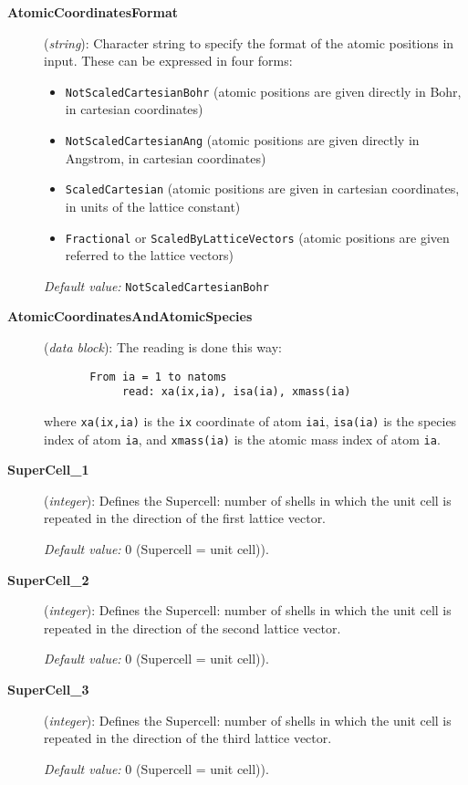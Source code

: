 \begin{description}
\item[{\bf AtomicCoordinatesFormat}] ({\it string}): 
Character string to specify the format of the atomic positions in
input. These can be expressed in four forms:
\begin{itemize}
\item {\tt NotScaledCartesianBohr} (atomic positions are given directly in
Bohr, in cartesian coordinates)
\item {\tt NotScaledCartesianAng} (atomic positions are given directly in
Angstrom, in cartesian coordinates)
\item {\tt ScaledCartesian} (atomic positions are given 
in cartesian coordinates, in units of the lattice constant)
\item {\tt Fractional} or {\tt ScaledByLatticeVectors} (atomic positions 
are given referred to the lattice vectors)
\end{itemize}

{\it Default value:} {\tt NotScaledCartesianBohr}



\item[{\bf AtomicCoordinatesAndAtomicSpecies}] ({\it data block}): 
The reading is done this way:
\begin{verbatim}
       From ia = 1 to natoms
            read: xa(ix,ia), isa(ia), xmass(ia)
\end{verbatim}
where {\tt xa(ix,ia)} is the {\tt ix} coordinate of atom 
{\tt iai}, {\tt isa(ia)} is the species index of atom {\tt ia}, and
{\tt xmass(ia)} is the atomic mass  index of atom {\tt ia}.

\item[{\bf SuperCell\_1}] ({\it integer}): 
Defines the Supercell:
number of shells in which the unit cell is repeated in the 
direction of the first lattice vector.

{\it Default value:} 0 (Supercell = unit cell)).

\item[{\bf SuperCell\_2}] ({\it integer}): 
Defines the Supercell:
number of shells in which the unit cell is repeated in the 
direction of the second lattice vector.

{\it Default value:} 0 (Supercell = unit cell)).

\item[{\bf SuperCell\_3}] ({\it integer}): 
Defines the Supercell:
number of shells in which the unit cell is repeated in the 
direction of the third lattice vector.

{\it Default value:} 0 (Supercell = unit cell)).


\end{description}
